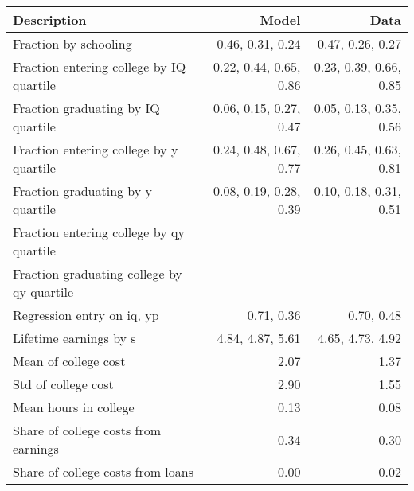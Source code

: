 \begin{tabular}{lrr}
\hline
Description & Model  & Data  \\
\hline
Fraction by schooling & 0.46, 0.31, 0.24  & 0.47, 0.26, 0.27  \\
Fraction entering college by IQ quartile & 0.22, 0.44, 0.65, 0.86  & 0.23, 0.39, 0.66, 0.85  \\
Fraction graduating by IQ quartile & 0.06, 0.15, 0.27, 0.47  & 0.05, 0.13, 0.35, 0.56  \\
Fraction entering college by y quartile & 0.24, 0.48, 0.67, 0.77  & 0.26, 0.45, 0.63, 0.81  \\
Fraction graduating by y quartile & 0.08, 0.19, 0.28, 0.39  & 0.10, 0.18, 0.31, 0.51  \\
Fraction entering college by qy quartile &   &   \\
Fraction graduating college by qy quartile &   &   \\
Regression entry on iq, yp & 0.71, 0.36  & 0.70, 0.48  \\
Lifetime earnings by s & 4.84, 4.87, 5.61  & 4.65, 4.73, 4.92  \\
Mean of college cost & 2.07  & 1.37  \\
Std of college cost & 2.90  & 1.55  \\
Mean hours in college & 0.13  & 0.08  \\
Share of college costs from earnings & 0.34  & 0.30  \\
Share of college costs from loans & 0.00  & 0.02  \\
\hline
\end{tabular}%
